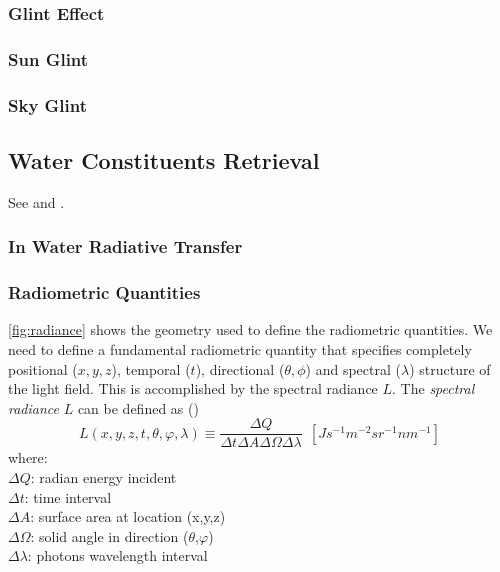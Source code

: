 \subsubsection{Glint Effect}

\subsubsection*{Sun Glint}

\subsubsection*{Sky Glint}
\subsection{Water Constituents Retrieval}
See \cite{Jensen} and \cite{Mustard2001}.
\subsubsection{In Water Radiative Transfer}

\subsubsection*{Radiometric Quantities}

\autoref{fig:radiance} shows the geometry used to define the radiometric quantities. We need to define a fundamental radiometric quantity that specifies completely positional ($x,y,z$), temporal ($t$), directional ($\theta,\phi$) and spectral ($\lambda$) structure of the light field. This is accomplished by the spectral radiance $L$. The {\it spectral radiance} $L$  can be defined as (\cite{Mobley:2001})
\begin{equation}\label{eq:rad1}
  L(x,y,z,t,\theta,\varphi,\lambda)\equiv\frac{\Delta Q}{\Delta t\Delta A\Delta\Omega\Delta\lambda}~~\left[ Js^{-1}m^{-2}sr^{-1}nm^{-1} \right]
\end{equation}
where:\\
      \noindent $\Delta Q$: radian energy incident \\
      $\Delta t$: time interval \\
      $\Delta A$: surface area at location (x,y,z)\\
      $\Delta\Omega$: solid angle in direction ($\theta$,$\varphi$) \\
      $\Delta\lambda$: photons wavelength interval

